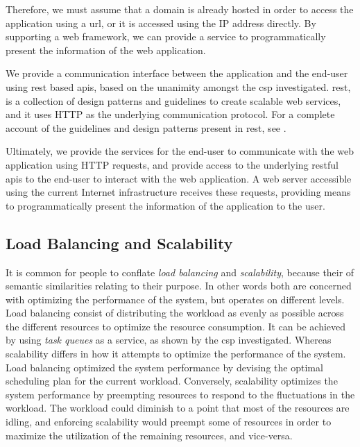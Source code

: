 \documentclass[12pt, titlepage]{uo_temp}
\begin{document}
     Therefore, we must assume that a domain is already hosted in order to access the
     application using a \gls{url}, or it is accessed using the IP address directly. By
     supporting a web framework, we can provide a service to programmatically present the
     information of the web application.
     
     We provide a communication interface between the application and the end-user using
     \gls{rest} based \gls{api}s, based on the unanimity amongst the \gls{csp}
     investigated.  \gls{rest}, is a collection of design patterns and guidelines to
     create scalable web services, and it uses HTTP as the underlying communication
     protocol. For a complete account of the guidelines and design patterns present
     in \gls{rest}, see \cite{richardson2008restful}.

     Ultimately, we provide the services for the end-user to communicate with the web
     application using HTTP requests, and provide access to the underlying \gls{rest}ful
     \gls{api}s to the end-user to interact with the web application. A web server
     accessible using the current Internet infrastructure receives these requests,
     providing means to programmatically present the information of the application to the
     user.

     \subsection{Load Balancing and Scalability}
     It is common for people to conflate \emph{load balancing} and \emph{scalability},
     because their of semantic similarities relating to their purpose. In other words both
     are concerned with optimizing the performance of the system, but operates on
     different levels. Load balancing consist of distributing the workload as evenly as
     possible across the different resources to optimize the resource consumption. It can
     be achieved by using \emph{task queues} as a service, as shown by the \gls{csp}
     investigated. Whereas scalability differs in how it attempts to optimize the
     performance of the system. Load balancing optimized the system performance by
     devising the optimal scheduling plan for the current workload. Conversely,
     scalability optimizes the system performance by preempting resources to respond to
     the fluctuations in the workload. The workload could diminish to a point that most of
     the resources are idling, and enforcing scalability would preempt some of
     resources in order to maximize the utilization of the remaining resources, and
     vice-versa. 
\end{document}
